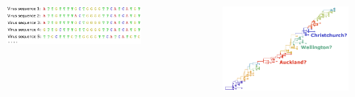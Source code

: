 \documentclass{beamer}
\begin{document}
\begin{frame}
\begin{columns}[c]
\begin{figure}
\includegraphics[width=0.9\linewidth]{FluSequence0.png}
\end{figure}
\begin{figure}
\includegraphics[width=0.9\linewidth]{InfluenzaTree0.png}
\end{figure}
\end{columns}

\end{frame}
\end{document}
